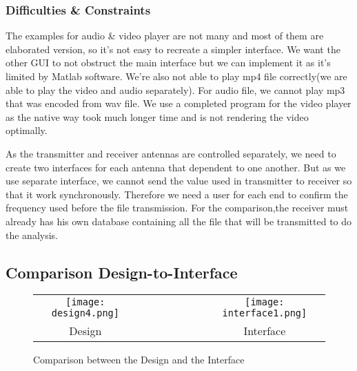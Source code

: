 \documentclass[12pt,a4paper]{article}
\begin{document}
\clearpage
\subsubsection{Difficulties \& Constraints}
\par \vspace{0.25cm} The examples for audio \& video player are not many and most of them are elaborated version, so it's not easy to recreate a simpler interface. We want the other GUI to not obstruct the main interface but we can implement it as it's limited by Matlab software. We're also not able to play mp4 file correctly(we are able to play the video and audio separately). For audio file, we cannot play mp3 that was encoded from wav file. We use a completed program for the video player as the native way took much longer time and is not rendering the video optimally. 
\par \vspace{0.25cm} As the transmitter and receiver antennas are controlled separately, we need to create two interfaces for each antenna that dependent to one another. But as we use separate interface, we cannot send the value used in transmitter to receiver so that it work synchronously. Therefore we need a user for each end to confirm the frequency used before the file transmission. For the comparison,the receiver must already has his own database containing all the file that will be transmitted to do the analysis.
  
\subsection{Comparison Design-to-Interface}
\begin{figure}[ht]
	\centering
		\begin{tabular}{c r r r | r r r c}
			\texttt{[image: design4.png]}&&&&&&&\texttt{[image: interface1.png]}\\
			Design&&&&&&&Interface
		\end{tabular}
	\caption{Comparison between the Design and the Interface}
	\label{fig:design-interface }
\end{figure}
\end{document}

